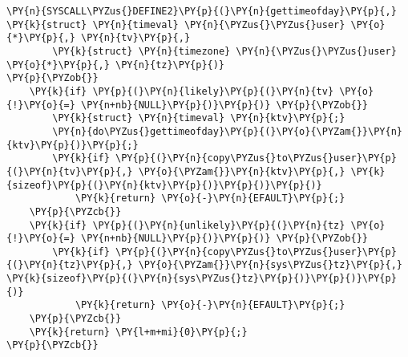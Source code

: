 \begin{Verbatim}[commandchars=\\\{\}]
\PY{n}{SYSCALL\PYZus{}DEFINE2}\PY{p}{(}\PY{n}{gettimeofday}\PY{p}{,} \PY{k}{struct} \PY{n}{timeval} \PY{n}{\PYZus{}\PYZus{}user} \PY{o}{*}\PY{p}{,} \PY{n}{tv}\PY{p}{,}
		\PY{k}{struct} \PY{n}{timezone} \PY{n}{\PYZus{}\PYZus{}user} \PY{o}{*}\PY{p}{,} \PY{n}{tz}\PY{p}{)}
\PY{p}{\PYZob{}}
	\PY{k}{if} \PY{p}{(}\PY{n}{likely}\PY{p}{(}\PY{n}{tv} \PY{o}{!}\PY{o}{=} \PY{n+nb}{NULL}\PY{p}{)}\PY{p}{)} \PY{p}{\PYZob{}}
		\PY{k}{struct} \PY{n}{timeval} \PY{n}{ktv}\PY{p}{;}
		\PY{n}{do\PYZus{}gettimeofday}\PY{p}{(}\PY{o}{\PYZam{}}\PY{n}{ktv}\PY{p}{)}\PY{p}{;}
		\PY{k}{if} \PY{p}{(}\PY{n}{copy\PYZus{}to\PYZus{}user}\PY{p}{(}\PY{n}{tv}\PY{p}{,} \PY{o}{\PYZam{}}\PY{n}{ktv}\PY{p}{,} \PY{k}{sizeof}\PY{p}{(}\PY{n}{ktv}\PY{p}{)}\PY{p}{)}\PY{p}{)}
			\PY{k}{return} \PY{o}{-}\PY{n}{EFAULT}\PY{p}{;}
	\PY{p}{\PYZcb{}}
	\PY{k}{if} \PY{p}{(}\PY{n}{unlikely}\PY{p}{(}\PY{n}{tz} \PY{o}{!}\PY{o}{=} \PY{n+nb}{NULL}\PY{p}{)}\PY{p}{)} \PY{p}{\PYZob{}}
		\PY{k}{if} \PY{p}{(}\PY{n}{copy\PYZus{}to\PYZus{}user}\PY{p}{(}\PY{n}{tz}\PY{p}{,} \PY{o}{\PYZam{}}\PY{n}{sys\PYZus{}tz}\PY{p}{,} \PY{k}{sizeof}\PY{p}{(}\PY{n}{sys\PYZus{}tz}\PY{p}{)}\PY{p}{)}\PY{p}{)}
			\PY{k}{return} \PY{o}{-}\PY{n}{EFAULT}\PY{p}{;}
	\PY{p}{\PYZcb{}}
	\PY{k}{return} \PY{l+m+mi}{0}\PY{p}{;}
\PY{p}{\PYZcb{}}
\end{Verbatim}
